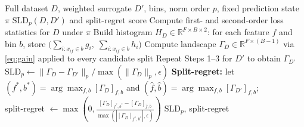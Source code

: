 \begin{algorithm}[!ht]
\caption{Compute Split-Landscape Discrepancy without candidate retraining}
\label{alg:sld}
\begin{algorithmic}[1]
\Require Full dataset $D$, weighted surrogate $D'$, bins, norm order $p$, fixed prediction state $\pi$
\Ensure $\mathrm{SLD}_p(D, D')$ and split-regret score
\State Compute first- and second-order loss statistics for $D$ under $\pi$
\State Build histogram $H_D \in \mathbb{R}^{F \times B \times 2}$:
       for each feature $f$ and bin $b$, store
       $\bigl(\textstyle\sum_{i: x_{if} \in b} g_i,\;
               \textstyle\sum_{i: x_{if} \in b} h_i\bigr)$
\State Compute landscape $\Gamma_D \in \mathbb{R}^{F \times (B-1)}$ via \eqref{eq:gain}
       applied to every candidate split
\State Repeat Steps 1--3 for $D'$ to obtain $\Gamma_{D'}$
\State $\mathrm{SLD}_p \leftarrow
       \lVert \Gamma_D - \Gamma_{D'} \rVert_p / \max(\lVert\Gamma_D\rVert_p,\epsilon)$
\State \textbf{Split-regret:} let $(f^*, b^*) = \arg\max_{f,b} [\Gamma_D]_{f,b}$
       and $(\hat{f}, \hat{b}) = \arg\max_{f,b} [\Gamma_{D'}]_{f,b}$; \\
       \hspace{4em} split-regret $\leftarrow
         \max\!\left(0,\frac{[\Gamma_D]_{f^*,b^*}-[\Gamma_D]_{\hat f,\hat b}}
         {\max(|[\Gamma_D]_{f^*,b^*}|,\epsilon)}\right)$
\State \Return $\mathrm{SLD}_p$, split-regret
\end{algorithmic}
\end{algorithm}
